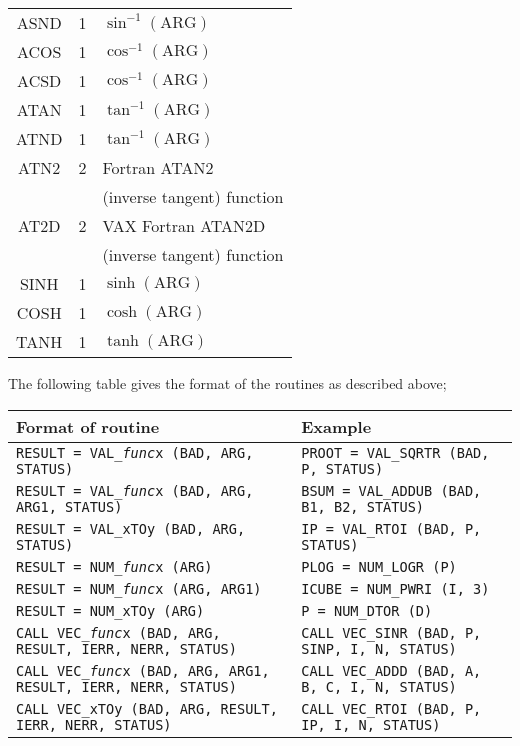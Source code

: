 \documentclass[twoside,11pt,nolof]{starlink}
\begin{document}
{\begin{tabular}{|c|c|l|}
ASND & 1 & $\sin ^{-1}(\mbox{ARG})$ \\
ACOS & 1 & $\cos ^{-1}(\mbox{ARG})$ \\
ACSD & 1 & $\cos ^{-1}(\mbox{ARG})$ \\
ATAN & 1 & $\tan ^{-1}(\mbox{ARG})$ \\
ATND & 1 & $\tan ^{-1}(\mbox{ARG})$ \\
ATN2 & 2 & Fortran ATAN2 \\
     &   & (inverse tangent) function \\
AT2D & 2 & VAX Fortran ATAN2D\\
     &   & (inverse tangent) function \\
SINH & 1 & $\sinh (\mbox{ARG})$ \\
COSH & 1 & $\cosh (\mbox{ARG})$ \\
TANH & 1 & $\tanh (\mbox{ARG})$ \\ \hline
\end{tabular}
}

\newpage
The following table gives the format of the routines as described above;

\begin{footnotesize}
\begin{tabular}{|l|l|} \hline
Format of routine & Example\\ \hline
\texttt{RESULT = VAL\_{\sl func\/}x (BAD, ARG, STATUS)}&
\texttt{PROOT = VAL\_SQRTR (BAD, P, STATUS)} \\
\texttt{RESULT = VAL\_{\sl func\/}x (BAD, ARG, ARG1, STATUS)}&
\texttt{BSUM = VAL\_ADDUB (BAD, B1, B2, STATUS)} \\
\texttt{RESULT = VAL\_xTOy (BAD, ARG, STATUS)}&
\texttt{IP = VAL\_RTOI (BAD, P, STATUS)} \\
\texttt{RESULT = NUM\_{\sl func\/}x (ARG)}&
\texttt{PLOG = NUM\_LOGR (P)} \\
\texttt{RESULT = NUM\_{\sl func\/}x (ARG, ARG1)}&
\texttt{ICUBE = NUM\_PWRI (I, 3)} \\
\texttt{RESULT = NUM\_xTOy (ARG)}&
\texttt{P = NUM\_DTOR (D)} \\
\texttt{CALL VEC\_{\sl func\/}x (BAD, ARG, RESULT, IERR, NERR, STATUS)}&
\texttt{CALL VEC\_SINR (BAD, P, SINP, I, N, STATUS)} \\
\texttt{CALL VEC\_{\sl func\/}x (BAD, ARG, ARG1, RESULT, IERR, NERR, STATUS)}&
\texttt{CALL VEC\_ADDD (BAD, A, B, C, I, N, STATUS)} \\
\texttt{CALL VEC\_xTOy (BAD, ARG, RESULT, IERR, NERR, STATUS)}&
\texttt{CALL VEC\_RTOI (BAD, P, IP, I, N, STATUS)} \\
\hline
\end{tabular}
\end{footnotesize}
\end{document}
